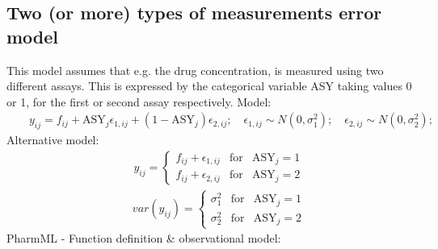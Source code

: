 \documentclass[a4paper,10pt]{article}
\begin{document}
\subsection{Two (or more) types of measurements error model}
\label{model8}
This model assumes that e.g. the drug concentration, is measured using two different assays. This is expressed by the categorical variable ASY taking values 0 or 1, for the first or second assay respectively.
Model:
\begin{eqnarray}
&& y_{ij} = f_{ij} + \text{ASY}_j\epsilon_{1,ij} + (1-\text{ASY}_j) \epsilon_{2,ij}; \quad \epsilon_{1,ij} \sim N(0,\sigma_1^2); \quad \epsilon_{2,ij} \sim N(0,\sigma_2^2); \nonumber
\end{eqnarray}
Alternative model:
\begin{eqnarray}
&& y_{ij} = \left\{ \begin{array}{rcl}  f_{ij} + \epsilon_{1,ij}  & \mbox{for} & \text{ASY}_j  = 1 \\
f_{ij} + \epsilon_{2,ij}  & \mbox{for} & \text{ASY}_j  = 2 \nonumber
\end{array}\right.
\end{eqnarray}
\begin{eqnarray}
&& \mathit{var}(y_{ij}) = \left\{ \begin{array}{rcl}  \sigma_{1}^2  & \mbox{for} & \text{ASY}_j  = 1 \\
\sigma_{2}^2  & \mbox{for} & \text{ASY}_j  = 2 \nonumber
\end{array}\right.
\end{eqnarray}
PharmML - Function definition \& observational model:
\end{document}

